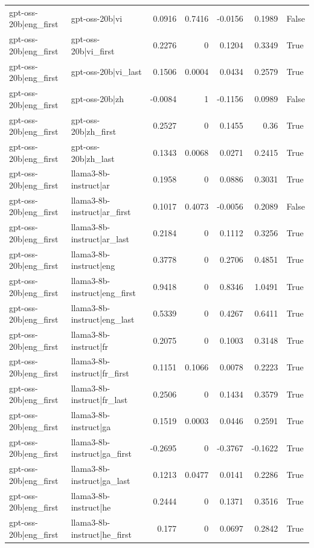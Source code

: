 \begin{table}
\begin{tabular}{l l r r r r l}
gpt-oss-20b|eng_first & gpt-oss-20b|vi & 0.0916 & 0.7416 & -0.0156 & 0.1989 & False \\
gpt-oss-20b|eng_first & gpt-oss-20b|vi_first & 0.2276 & 0 & 0.1204 & 0.3349 & True \\
gpt-oss-20b|eng_first & gpt-oss-20b|vi_last & 0.1506 & 0.0004 & 0.0434 & 0.2579 & True \\
gpt-oss-20b|eng_first & gpt-oss-20b|zh & -0.0084 & 1 & -0.1156 & 0.0989 & False \\
gpt-oss-20b|eng_first & gpt-oss-20b|zh_first & 0.2527 & 0 & 0.1455 & 0.36 & True \\
gpt-oss-20b|eng_first & gpt-oss-20b|zh_last & 0.1343 & 0.0068 & 0.0271 & 0.2415 & True \\
gpt-oss-20b|eng_first & llama3-8b-instruct|ar & 0.1958 & 0 & 0.0886 & 0.3031 & True \\
gpt-oss-20b|eng_first & llama3-8b-instruct|ar_first & 0.1017 & 0.4073 & -0.0056 & 0.2089 & False \\
gpt-oss-20b|eng_first & llama3-8b-instruct|ar_last & 0.2184 & 0 & 0.1112 & 0.3256 & True \\
gpt-oss-20b|eng_first & llama3-8b-instruct|eng & 0.3778 & 0 & 0.2706 & 0.4851 & True \\
gpt-oss-20b|eng_first & llama3-8b-instruct|eng_first & 0.9418 & 0 & 0.8346 & 1.0491 & True \\
gpt-oss-20b|eng_first & llama3-8b-instruct|eng_last & 0.5339 & 0 & 0.4267 & 0.6411 & True \\
gpt-oss-20b|eng_first & llama3-8b-instruct|fr & 0.2075 & 0 & 0.1003 & 0.3148 & True \\
gpt-oss-20b|eng_first & llama3-8b-instruct|fr_first & 0.1151 & 0.1066 & 0.0078 & 0.2223 & True \\
gpt-oss-20b|eng_first & llama3-8b-instruct|fr_last & 0.2506 & 0 & 0.1434 & 0.3579 & True \\
gpt-oss-20b|eng_first & llama3-8b-instruct|ga & 0.1519 & 0.0003 & 0.0446 & 0.2591 & True \\
gpt-oss-20b|eng_first & llama3-8b-instruct|ga_first & -0.2695 & 0 & -0.3767 & -0.1622 & True \\
gpt-oss-20b|eng_first & llama3-8b-instruct|ga_last & 0.1213 & 0.0477 & 0.0141 & 0.2286 & True \\
gpt-oss-20b|eng_first & llama3-8b-instruct|he & 0.2444 & 0 & 0.1371 & 0.3516 & True \\
gpt-oss-20b|eng_first & llama3-8b-instruct|he_first & 0.177 & 0 & 0.0697 & 0.2842 & True \\

\end{tabular}
\end{table}
